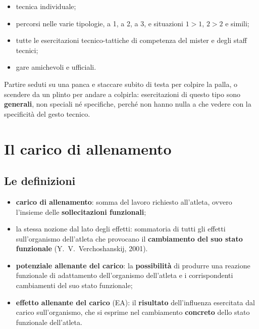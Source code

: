 \begin{itemize}
  \item tecnica individuale;
  \item percorsi nelle varie tipologie, a 1, a 2, a 3, e situazioni $1 > 1$, $2 > 2$ e simili;
  \item tutte le esercitazioni tecnico-tattiche di competenza del mister e degli staff tecnici;
  \item gare amichevoli e ufficiali.
\end{itemize}

Partire seduti su una panca e staccare subito di testa per colpire la palla, o scendere da un plinto
per andare a colpirla: esercitazioni di questo tipo sono \textbf{generali}, non speciali né
specifiche, perché non hanno nulla a che vedere con la specificità del gesto tecnico.

\section{Il carico di allenamento}

\subsection{Le definizioni}

\begin{itemize}
  \item \textbf{carico di allenamento}: somma del lavoro richiesto all'atleta, ovvero l'insieme
    delle \textbf{sollecitazioni funzionali};
  \item la stessa nozione dal lato degli effetti: sommatoria di tutti gli effetti sull'organismo
    dell'atleta che provocano il \textbf{cambiamento del suo stato funzionale}
    (Y.~V.~Verchoshanskij, 2001).
\end{itemize}

\begin{itemize}
  \item \textbf{potenziale allenante del carico}: la \textbf{possibilità} di produrre una reazione
    funzionale di adattamento dell'organismo dell'atleta e i corrispondenti cambiamenti del suo
    stato funzionale;
  \item \textbf{effetto allenante del carico} (EA): il \textbf{risultato} dell'influenza esercitata
    dal carico sull'organismo, che si esprime nel cambiamento \textbf{concreto} dello stato
    funzionale dell'atleta.
\end{itemize}

